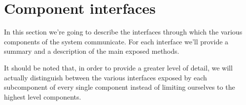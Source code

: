 \begin{landscape}

\end{landscape}

\begin{landscape}

\end{landscape}

\begin{landscape}

\end{landscape}

\begin{landscape}

\end{landscape}

\begin{landscape}

\end{landscape}

\begin{landscape}

\end{landscape}

\begin{landscape}

\end{landscape}

\begin{landscape}

\end{landscape}





\section{Component interfaces}
In this section we're going to describe the interfaces through which the various components of the system communicate. For each interface we'll provide a summary and a description of the main exposed methods. 

It should be noted that, in order to provide a greater level of detail, we will actually distinguish between the various interfaces exposed by each subcomponent of every single component instead of limiting ourselves to the highest level components. 

